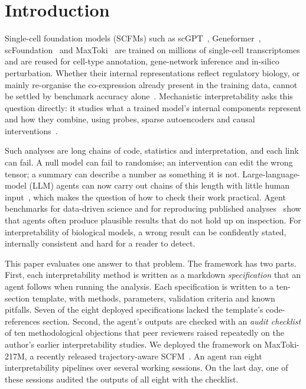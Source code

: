 \documentclass[10pt,letterpaper]{article}
\newcommand{\scfm}{SCFM\xspace}
\begin{document}
\clearpage
{}
\fancyheadoffset[L]{0pt}
\fancyfootoffset[L]{0pt}
\linenumbers

\section*{Introduction}

Single-cell foundation models (\scfm{}s) such as
scGPT~\cite{cui2024scgpt}, Geneformer~\cite{theodoris2023geneformer},
scFoundation~\cite{hao2024scfoundation} and
MaxToki~\cite{maxtoki2026} are trained on millions of single-cell
transcriptomes and are reused for cell-type annotation, gene-network
inference and in-silico perturbation. Whether their internal
representations reflect regulatory biology, or mainly re-organise the
co-expression already present in the training data, cannot be settled by
benchmark accuracy
alone~\cite{kedzierska2023assessing,liu2023evaluating,wenteler2024perteval}.
Mechanistic interpretability asks this question directly: it studies what
a trained model's internal components represent and how they combine,
using probes, sparse autoencoders and causal
interventions~\cite{bricken2023monosemanticity,conmy2023acdc,wang2023ioi,sharkey2025open}.

Such analyses are long chains of code, statistics and interpretation, and
each link can fail. A null model can fail to randomise; an intervention
can edit the wrong tensor; a summary can describe a number as something
it is not. Large-language-model (LLM) agents can now carry out chains of
this length with little human
input~\cite{lu2024aiscientist,boiko2023autonomous,mbran2024chemcrow,yang2024sweagent,chan2024mlebench},
which makes the question of how to check their work practical. Agent
benchmarks for data-driven science and for reproducing published
analyses~\cite{chen2024scienceagentbench,siegel2024corebench,starace2025paperbench}
show that agents often produce plausible results that do not hold up on
inspection. For interpretability of biological models, a wrong result can
be confidently stated, internally consistent and hard for a reader to
detect.

This paper evaluates one answer to that problem. The framework has two
parts. First, each interpretability method is written as a markdown
\emph{specification} that an agent follows when running the analysis.
Each specification is written to a ten-section template, with methods,
parameters, validation criteria and known pitfalls. Seven of the eight
deployed specifications lacked the template's code-references section.
Second, the agent's outputs are checked with an \emph{audit checklist}
of ten methodological objections that peer reviewers raised repeatedly
on the author's earlier interpretability studies. We
deployed the framework on MaxToki-217M, a recently released
trajectory-aware \scfm{}~\cite{maxtoki2026}. An agent ran eight
interpretability pipelines over several working sessions. On the last
day, one of these sessions audited the outputs of all eight with the
checklist.
\end{document}

